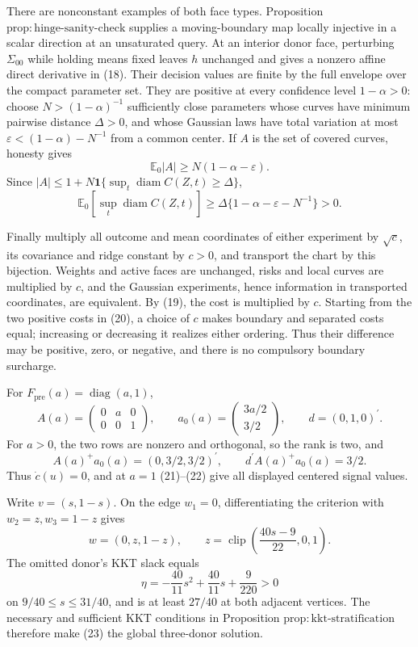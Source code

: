 There are nonconstant examples of both face types.  Proposition \(\mathrm{prop:hinge\mbox{-}sanity\mbox{-}check}\) supplies a moving-boundary map locally injective in a scalar direction at an unsaturated query.  At an interior donor face, perturbing \(\Sigma_{00}\) while holding means fixed leaves \(h\) unchanged and gives a nonzero affine direct derivative in (18).  Their decision values are finite by the full envelope over the compact parameter set.  They are positive at every confidence level \(1-\alpha>0\): choose \(N>(1-\alpha)^{-1}\) sufficiently close parameters whose curves have minimum pairwise distance \(\Delta>0\), and whose Gaussian laws have total variation at most \(\varepsilon<(1-\alpha)-N^{-1}\) from a common center.  If \(A\) is the set of covered curves, honesty gives
\[
 \mathbb E_0|A|\geq N(1-\alpha-\varepsilon).
\]
Since \(|A|\leq1+N\mathbf1\{\sup_t\operatorname{diam}C(Z,t)\geq\Delta\}\),
\[
 \mathbb E_0[\sup_t\operatorname{diam}C(Z,t)]
 \geq\Delta\{1-\alpha-\varepsilon-N^{-1}\}>0.
\tag{20}
\]

Finally multiply all outcome and mean coordinates of either experiment by \(\sqrt c\), its covariance and ridge constant by \(c>0\), and transport the chart by this bijection.  Weights and active faces are unchanged, risks and local curves are multiplied by \(c\), and the Gaussian experiments, hence information in transported coordinates, are equivalent.  By (19), the cost is multiplied by \(c\).  Starting from the two positive costs in (20), a choice of \(c\) makes boundary and separated costs equal; increasing or decreasing it realizes either ordering.  Thus their difference may be positive, zero, or negative, and there is no compulsory boundary surcharge.

For \(F_{\mathrm{pre}}(a)=\operatorname{diag}(a,1)\),
\[
 A(a)=\begin{pmatrix}0&a&0\\0&0&1\end{pmatrix},\qquad
 a_0(a)=\begin{pmatrix}3a/2\\3/2\end{pmatrix},\qquad
 d=(0,1,0)^\prime.
\tag{21}
\]
For \(a>0\), the two rows are nonzero and orthogonal, so the rank is two, and
\[
 A(a)^+a_0(a)=(0,3/2,3/2)^\prime,\qquad
 d^\prime A(a)^+a_0(a)=3/2.
\tag{22}
\]
Thus \(\dot c(u)=0\), and at \(a=1\) (21)--(22) give all displayed centered signal values.

Write \(v=(s,1-s)\).  On the edge \(w_1=0\), differentiating the criterion with \(w_2=z,w_3=1-z\) gives
\[
 w=(0,z,1-z),\qquad
 z=\operatorname{clip}\!\left(\frac{40s-9}{22},0,1\right).
\tag{23}
\]
The omitted donor's KKT slack equals
\[
 \eta=-\frac{40}{11}s^2+\frac{40}{11}s+\frac9{220}>0
\tag{24}
\]
on \(9/40\leq s\leq31/40\), and is at least \(27/40\) at both adjacent vertices.  The necessary and sufficient KKT conditions in Proposition \(\mathrm{prop:kkt\mbox{-}stratification}\) therefore make (23) the global three-donor solution.


